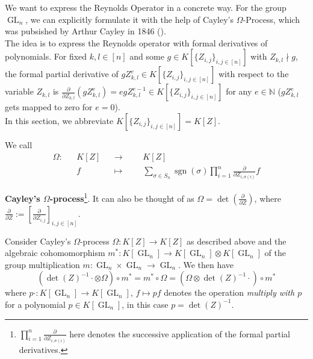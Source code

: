 We want to express the Reynolds Operator in a concrete way.
For the group $\operatorname{GL}_n$, we can explicitly formulate it with the help of Cayley's $\Omega$-Process, which was pubsished by Arthur Cayley in 1846 (\cite{Cay46}).  \\
The idea is to express the Reynolds operator with formal derivatives of polynomials.
For fixed $k,l \in[n]$ and some $g \in K[\{Z_{i,j}\}_{i,j \in[n]}]$ with $Z_{k,l} \nmid g$, the formal partial derivative of $g Z_{k,l}^e \in K[\{Z_{i,j}\}_{i,j \in[n]}]$ with respect to the variable $Z_{k,l}$ is \linebreak$\frac{\partial}{\partial Z_{k,l}}(g Z_{k,l}^e) = eg Z_{k,l}^{e-1} \in K[\{Z_{i,j}\}_{i,j \in[n]}]$ for any $e \in \mathbb{N}$ ($gZ_{k,l}^e$ gets mapped to zero for $e = 0$).  \\
In this section, we abbreviate $K[\{Z_{i,j}\}_{i,j \in[n]}] = K[Z]$.

\begin{definition}
  We call
  \begin{equation}
    \begin{aligned}
      \Omega \colon && K[Z] && \longrightarrow &&&K[Z]  \\
      && f &&\longmapsto &&&\sum_{\sigma \in S_n} \operatorname{sgn} \left( \sigma \right) \prod_{ i =1 }^n \frac{\partial}{\partial Z_{i , \sigma \left( i \right)}} f
    \end{aligned}
  \end{equation}
\end{definition}
\textbf{Cayley's $\Omega$-process}\footnote{$\prod_{i=1}^n\frac{\partial}{\partial Z_{i , \sigma \left( i \right)}}$ here denotes the successive application of the formal partial derivatives.}.
It can also be thought of as $ \Omega = \operatorname{det} \left( \frac{\partial}{\partial Z} \right) $, where \linebreak$\frac{\partial}{\partial Z} := \left\lbrack \frac{\partial}{\partial Z_{i,j}} \right\rbrack_{i,j \in [ n ]} $.

\begin{lemma}
  Consider Cayley's $\Omega$-process $\Omega \colon K[Z] \rightarrow K[Z]$ as described above and the algebraic cohomomorphism $m^\ast \colon K[\operatorname{GL}_n] \rightarrow K[\operatorname{GL}_n] \otimes K[\operatorname{GL}_n]$ of the group multiplication $m \colon \operatorname{GL}_n\times \operatorname{GL}_n \rightarrow \operatorname{GL}_n$.
  We then have
  \begin{equation}
    \left( \operatorname{det} \left( Z \right) ^{-1} {\cdot} \otimes \Omega \right) \circ m^\ast
    = m^\ast \circ \Omega
    = \left( \Omega \otimes \operatorname{det} \left( Z \right) ^{-1} {\cdot} \right) \circ m^\ast
  \end{equation}
  where  $ p {\cdot} \colon K[\operatorname{GL}_n] \rightarrow K[\operatorname{GL}_n]$, $f \mapsto pf$ denotes the operation \textit{multiply with $ p $} for a polynomial $ p \in K \left\lbrack \operatorname{GL}_n \right\rbrack $, in this case $p = \operatorname{det}(Z)^{-1}$.
\end{lemma}

